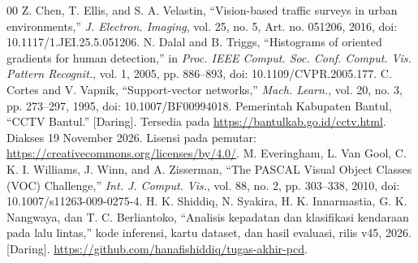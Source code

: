 \documentclass[conference,a4paper]{IEEEtran}
\begin{document}
\begin{thebibliography}{00}
 Z. Chen, T. Ellis, and S. A. Velastin, ``Vision-based traffic surveys in urban environments,'' \textit{J. Electron. Imaging}, vol. 25, no. 5, Art. no. 051206, 2016, doi: 10.1117/1.JEI.25.5.051206.
 N. Dalal and B. Triggs, ``Histograms of oriented gradients for human detection,'' in \textit{Proc. IEEE Comput. Soc. Conf. Comput. Vis. Pattern Recognit.}, vol. 1, 2005, pp. 886--893, doi: 10.1109/CVPR.2005.177.
 C. Cortes and V. Vapnik, ``Support-vector networks,'' \textit{Mach. Learn.}, vol. 20, no. 3, pp. 273--297, 1995, doi: 10.1007/BF00994018.
 Pemerintah Kabupaten Bantul, ``CCTV Bantul.'' [Daring]. Tersedia pada \url{https://bantulkab.go.id/cctv.html}. Diakses 19 November 2026. Lisensi pada pemutar: \url{https://creativecommons.org/licenses/by/4.0/}.
 M. Everingham, L. Van Gool, C. K. I. Williams, J. Winn, and A. Zisserman, ``The PASCAL Visual Object Classes (VOC) Challenge,'' \textit{Int. J. Comput. Vis.}, vol. 88, no. 2, pp. 303--338, 2010, doi: 10.1007/s11263-009-0275-4.
 H. K. Shiddiq, N. Syakira, H. K. Innarmastia, G. K. Nangwaya, dan T. C. Berliantoko, ``Analisis kepadatan dan klasifikasi kendaraan pada lalu lintas,'' kode inferensi, kartu dataset, dan hasil evaluasi, rilis v45, 2026. [Daring]. \url{https://github.com/hanafishiddiq/tugas-akhir-pcd}.
\end{thebibliography}
\end{document}
